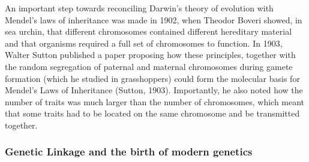 \vspace{4mm}
An important step towards reconciling Darwin’s theory of evolution with Mendel’s laws of inheritance was made in 1902, when Theodor Boveri showed, in sea urchin, that different chromosomes contained different hereditary material and that organisms required a full set of chromosomes to function. 
In 1903, Walter Sutton published a paper proposing how these principles, together with the random segregation of paternal and maternal chromosomes during gamete formation (which he studied in grasshoppers) could form the molecular basis for Mendel’s Laws of Inheritance (Sutton, 1903). 
Importantly, he also noted how the number of traits was much larger than the number of chromosomes, which meant that some traits had to be located on the same chromosome and be transmitted together.

\subsubsection{Genetic Linkage and the birth of modern genetics}

